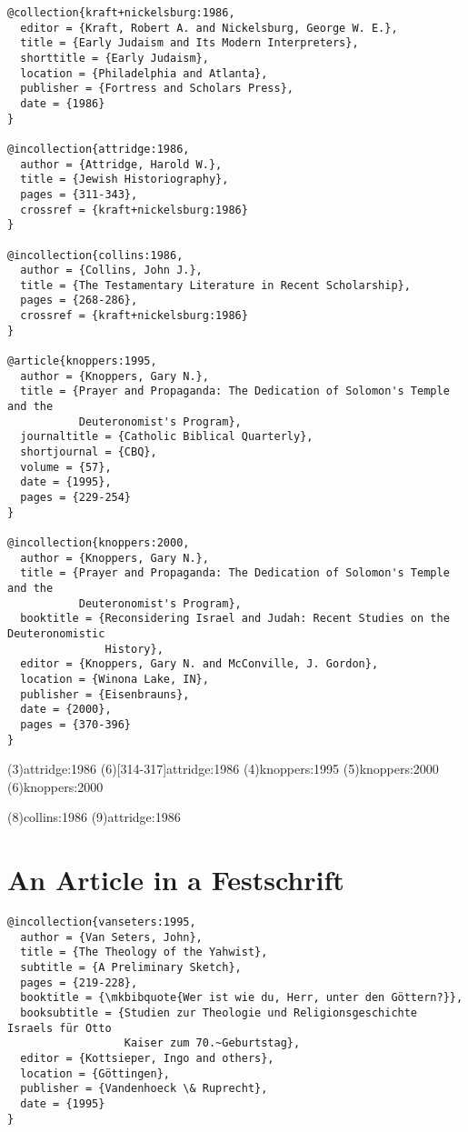 \documentclass[a4paper]{article}
\begin{document}
\begin{verbatim}
@collection{kraft+nickelsburg:1986,
  editor = {Kraft, Robert A. and Nickelsburg, George W. E.},
  title = {Early Judaism and Its Modern Interpreters},
  shorttitle = {Early Judaism},
  location = {Philadelphia and Atlanta},
  publisher = {Fortress and Scholars Press},
  date = {1986}
}

@incollection{attridge:1986,
  author = {Attridge, Harold W.},
  title = {Jewish Historiography},
  pages = {311-343},
  crossref = {kraft+nickelsburg:1986}
}

@incollection{collins:1986,
  author = {Collins, John J.},
  title = {The Testamentary Literature in Recent Scholarship},
  pages = {268-286},
  crossref = {kraft+nickelsburg:1986}
}

@article{knoppers:1995,
  author = {Knoppers, Gary N.},
  title = {Prayer and Propaganda: The Dedication of Solomon's Temple and the
           Deuteronomist's Program},
  journaltitle = {Catholic Biblical Quarterly},
  shortjournal = {CBQ},
  volume = {57},
  date = {1995},
  pages = {229-254}
}

@incollection{knoppers:2000,
  author = {Knoppers, Gary N.},
  title = {Prayer and Propaganda: The Dedication of Solomon's Temple and the
           Deuteronomist's Program},
  booktitle = {Reconsidering Israel and Judah: Recent Studies on the Deuteronomistic
               History},
  editor = {Knoppers, Gary N. and McConville, J. Gordon},
  location = {Winona Lake, IN},
  publisher = {Eisenbrauns},
  date = {2000},
  pages = {370-396}
}
\end{verbatim}

\examplecite(3){attridge:1986}
\examplecite(6)[314-317]{attridge:1986}
\examplecite(4){knoppers:1995}
\examplecite(5){knoppers:2000}
\examplecite(6){knoppers:2000}
\begin{verbcite}
  \citereset
\end{verbcite}
\examplecite(8){collins:1986}
\examplecite(9){attridge:1986}
\exampleabbreviations
\examplebibliography

\section{An Article in a Festschrift}

\begin{verbatim}
@incollection{vanseters:1995,
  author = {Van Seters, John},
  title = {The Theology of the Yahwist},
  subtitle = {A Preliminary Sketch},
  pages = {219-228},
  booktitle = {\mkbibquote{Wer ist wie du, Herr, unter den Göttern?}},
  booksubtitle = {Studien zur Theologie und Religionsgeschichte Israels für Otto
                  Kaiser zum 70.~Geburtstag},
  editor = {Kottsieper, Ingo and others},
  location = {Göttingen},
  publisher = {Vandenhoeck \& Ruprecht},
  date = {1995}
}
\end{verbatim}
\end{document}
